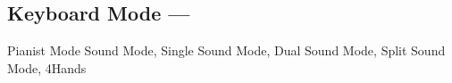 \subsection[Keyboard Mode]{Keyboard Mode --- \UiKey{\SND}}
Pianist Mode
Sound Mode, Single
Sound Mode, Dual
Sound Mode, Split
Sound Mode, 4Hands
